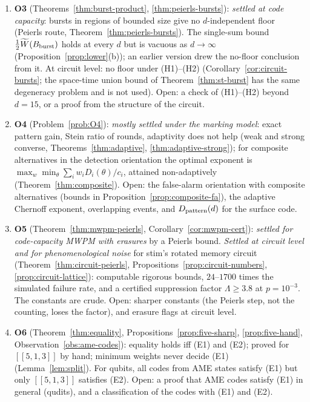 \begin{enumerate}
\item \textbf{O3} (Theorems~\ref{thm:burst-product}, \ref{thm:peierls-bursts}): \emph{settled at code capacity}: bursts in regions of bounded size give no $d$-independent floor (Peierls route, Theorem~\ref{thm:peierls-bursts}). The single-sum bound $\tfrac12\widetilde W(B_{\rm burst})$ holds at every $d$ but is vacuous as $d\to\infty$ (Proposition~\ref{prop:lower}(b)); an earlier version drew the no-floor conclusion from it. At circuit level: no floor under (H1)--(H2) (Corollary~\ref{cor:circuit-bursts}; the space-time union bound of Theorem~\ref{thm:st-burst} has the same degeneracy problem and is not used). Open: a check of (H1)--(H2) beyond $d=15$, or a proof from the structure of the circuit.
\item \textbf{O4} (Problem~\ref{prob:O4}): \emph{mostly settled under the marking model}: exact pattern gain, Stein ratio of rounds, adaptivity does not help (weak and strong converse, Theorems~\ref{thm:adaptive}, \ref{thm:adaptive-strong}); for composite alternatives in the detection orientation the optimal exponent is $\max_w\min_\theta\sum_iw_iD_i(\theta)/c_i$, attained non-adaptively (Theorem~\ref{thm:composite}). Open: the false-alarm orientation with composite alternatives (bounds in Proposition~\ref{prop:composite-fa}), the adaptive Chernoff exponent, overlapping events, and $D_{\rm pattern}(d)$ for the surface code.
\item \textbf{O5} (Theorem~\ref{thm:mwpm-peierls}, Corollary~\ref{cor:mwpm-cert}): \emph{settled for code-capacity MWPM with erasures} by a Peierls bound. \emph{Settled at circuit level and for phenomenological noise} for stim's rotated memory circuit (Theorem~\ref{thm:circuit-peierls}, Propositions~\ref{prop:circuit-numbers}, \ref{prop:circuit-lattice}): computable rigorous bounds, $24$--$1700$ times the simulated failure rate, and a certified suppression factor $\Lambda\ge3.8$ at $p=10^{-3}$. The constants are crude. Open: sharper constants (the Peierls step, not the counting, loses the factor), and erasure flags at circuit level.
\item \textbf{O6} (Theorem~\ref{thm:equality}, Propositions~\ref{prop:five-sharp}, \ref{prop:five-hand}, Observation~\ref{obs:ame-codes}): equality holds iff (E1) and (E2); proved for $[[5,1,3]]$ by hand; minimum weights never decide (E1) (Lemma~\ref{lem:split}). For qubits, all codes from AME states satisfy (E1) but only $[[5,1,3]]$ satisfies (E2). Open: a proof that AME codes satisfy (E1) in general (qudits), and a classification of the codes with (E1) and (E2).

\end{enumerate}
